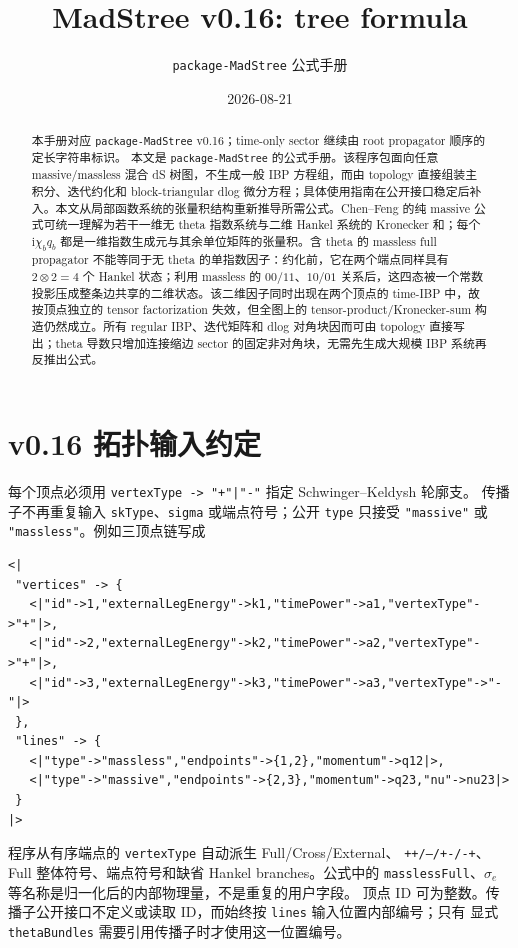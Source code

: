 \documentclass[11pt,a4paper]{ctexart}
\title{MadStree v0.16: tree formula}
\author{\texttt{package-MadStree} 公式手册}
\date{2026-08-21}
\newcommand{\ii}{\mathrm i}
\begin{document}
\maketitle

\begin{abstract}
本手册对应 \texttt{package-MadStree} v0.16；time-only sector 继续由 root propagator 顺序的定长字符串标识。
本文是 \texttt{package-MadStree} 的公式手册。该程序包面向任意 massive/massless 混合 dS 树图，不生成一般 IBP 方程组，而由 topology 直接组装主积分、迭代约化和 block-triangular dlog 微分方程；具体使用指南在公开接口稳定后补入。本文从局部函数系统的张量积结构重新推导所需公式。Chen--Feng 的纯 massive 公式可统一理解为若干一维无 theta 指数系统与二维 Hankel 系统的 Kronecker 和；每个 $\ii\chi_bq_b$ 都是一维指数生成元与其余单位矩阵的张量积。含 theta 的 massless full propagator 不能等同于无 theta 的单指数因子：约化前，它在两个端点同样具有 $2\otimes2=4$ 个 Hankel 状态；利用 massless 的 $00/11$、$10/01$ 关系后，这四态被一个常数投影压成整条边共享的二维状态。该二维因子同时出现在两个顶点的 time-IBP 中，故按顶点独立的 tensor factorization 失效，但全图上的 tensor-product/Kronecker-sum 构造仍然成立。所有 regular IBP、迭代矩阵和 dlog 对角块因而可由 topology 直接写出；theta 导数只增加连接缩边 sector 的固定非对角块，无需先生成大规模 IBP 系统再反推出公式。
\end{abstract}

\tableofcontents

\section{v0.16 拓扑输入约定}

每个顶点必须用 \texttt{vertexType -> "+"|"-"} 指定 Schwinger--Keldysh 轮廓支。
传播子不再重复输入 \texttt{skType}、\texttt{sigma} 或端点符号；公开
\texttt{type} 只接受 \texttt{"massive"} 或 \texttt{"massless"}。例如三顶点链写成
\begin{verbatim}
<|
 "vertices" -> {
   <|"id"->1,"externalLegEnergy"->k1,"timePower"->a1,"vertexType"->"+"|>,
   <|"id"->2,"externalLegEnergy"->k2,"timePower"->a2,"vertexType"->"+"|>,
   <|"id"->3,"externalLegEnergy"->k3,"timePower"->a3,"vertexType"->"-"|>
 },
 "lines" -> {
   <|"type"->"massless","endpoints"->{1,2},"momentum"->q12|>,
   <|"type"->"massive","endpoints"->{2,3},"momentum"->q23,"nu"->nu23|>
 }
|>
\end{verbatim}
程序从有序端点的 \texttt{vertexType} 自动派生 Full/Cross/External、
\texttt{++/--/+-/-+}、Full 整体符号、端点符号和缺省 Hankel branches。公式中的
\texttt{masslessFull}、$\sigma_e$ 等名称是归一化后的内部物理量，不是重复的用户字段。
顶点 ID 可为整数。传播子公开接口不定义或读取 ID，而始终按 \texttt{lines} 输入位置内部编号；只有
显式 \texttt{thetaBundles} 需要引用传播子时才使用这一位置编号。
\end{document}
